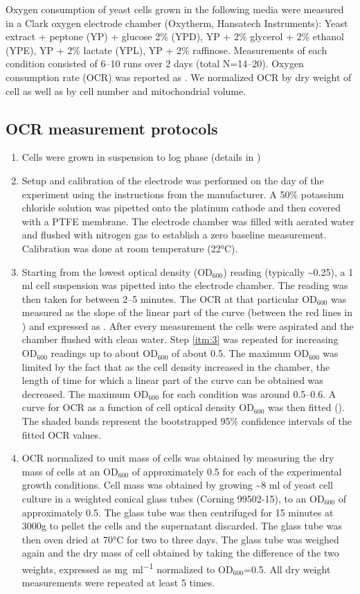 Oxygen consumption of yeast cells grown in the following media were measured in a Clark oxygen electrode chamber (Oxytherm, Hansatech Instruments): Yeast extract + peptone (YP) + glucose 2\% (YPD), YP + 2\% glycerol + 2\% ethanol (YPE), YP + 2\% lactate (YPL), YP + 2\% raffinose. Measurements of each condition consisted of 6--10 runs over 2 days (total N=14--20). Oxygen consumption rate (OCR) was reported as \si{\OCR}. We normalized OCR by dry weight of cell as well as by cell number and mitochondrial volume.
\subsection{OCR measurement protocols}
\begin{enumerate}[label=\arabic*), leftmargin=*, itemindent=0pc]
\item Cells were grown in suspension to log phase (details in )
\item Setup and calibration of the electrode was performed on the day of the experiment using the instructions from the manufacturer. A 50\% potassium chloride solution was pipetted onto the platinum cathode and then covered with a PTFE membrane. The electrode chamber was filled with aerated water and flushed with nitrogen gas to establish a zero baseline measurement. Calibration was done at room temperature (22°C).
\item\label{itm:3} Starting from the lowest optical density (OD$_{600}$) reading (typically \textasciitilde0.25), a 1 ml cell suspension was pipetted into the electrode chamber. The reading was then taken for between 2--5 minutes. The OCR at that particular OD$_{600}$ was measured as the slope of the linear part of the curve (between the red lines in ) and expressed as \si{\OCR}. After every measurement the cells were aspirated and the chamber flushed with clean water.
Step \ref{itm:3} was repeated for increasing OD$_{600}$ readings up to about OD$_{600}$ of about 0.5.  The maximum OD$_{600}$ was limited by the fact that as the cell density increased in the chamber, the length of time for which a linear part of the curve can be obtained was decreased. The maximum OD$_{600}$ for each condition was around 0.5--0.6. A curve for OCR as a function of cell optical density OD$_{600}$ was then fitted (). The shaded bands represent the bootstrapped 95\% confidence intervals of the fitted OCR values.
\item OCR normalized to unit mass of cells was obtained by measuring the dry mass of cells at an OD$_{600}$ of approximately 0.5 for each of the experimental growth conditions. Cell mass was obtained by growing \textasciitilde{8 ml} of yeast cell culture in a weighted conical glass tubes (Corning 99502-15), to an OD$_{600}$ of approximately 0.5. The glass tube was then centrifuged for 15 minutes at 3000g to pellet the cells and the supernatant discarded. The glass tube was then oven dried at 70°C for two to three days. The glass tube was weighed again and the dry mass of cell obtained by taking the difference of the two weights, expressed as \si{\mg\per\ml} normalized to OD$_{600}$=0.5.  All dry weight measurements were repeated at least 5 times.

\end{enumerate}
